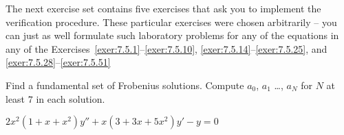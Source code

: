 \documentclass{ximera}
\begin{document}
The next exercise set contains five exercises that ask you to implement the verification
procedure. These particular exercises were chosen arbitrarily --   you can
just as well formulate such laboratory problems for any of the
equations in any  of the Exercises~\ref{exer:7.5.1}--\ref{exer:7.5.10},
\ref{exer:7.5.14}--\ref{exer:7.5.25}, and \ref{exer:7.5.28}--\ref{exer:7.5.51}


\begin{problem}\label{exer:7.5.1} 
Find a fundamental
set
of Frobenius solutions. Compute $a_0$, $a_{1}$ \dots, $a_N$ for $N$ at
least
$7$ in
each solution.

$2x^2(1+x+x^2)y''+x(3+3x+5x^2)y'-y=0$

\end{problem}

\end{document}
